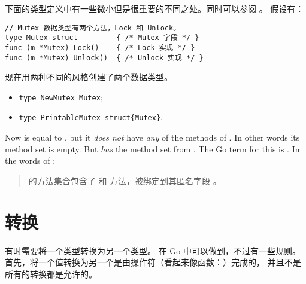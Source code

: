 下面的类型定义中有一些微小但是很重要的不同之处。同时可以参阅 \cite[section~``Type Declarations'']{go_spec}。
假设有：
\begin{lstlisting}
// Mutex 数据类型有两个方法，Lock 和 Unlock。
type Mutex struct         { /* Mutex 字段 */ }
func (m *Mutex) Lock()    { /* Lock 实现 */ }
func (m *Mutex) Unlock()  { /* Unlock 实现 */ }
\end{lstlisting}
现在用两种不同的风格创建了两个数据类型。
\begin{itemize}
    \item{\lstinline|type NewMutex Mutex|};
    \item{\lstinline|type PrintableMutex struct{Mutex}|}.
\end{itemize}
Now  is equal to , but
it \emph{does not} have \emph{any} of the methods of . In other words
its method set is empty.
But  \emph{has}  the 
method set from . The Go term for this is .
In the words of \cite{go_spec}:
\begin{quote}
 的方法集合包含了
 和  方法，被绑定到其匿名字段 。
\end{quote}

\section{转换}
\label{sec:conversions}
有时需要将一个类型转换为另一个类型。
在 Go 中可以做到，不过有一些规则。首先，将一个值转换为另一个是由操作符（看起来像函数：）完成的，
并且不是所有的转换都是允许的。

\begin{table}[H]
\begin{center}
\caption[Valid conversions]{合法的转换， 
\lstinline{float64} 同 \lstinline{float32} 类似。注意，
为了适配表格的显示，float32 被简写为~flt32。}
\label{tab:convesion}

\end{center}
\end{table}

